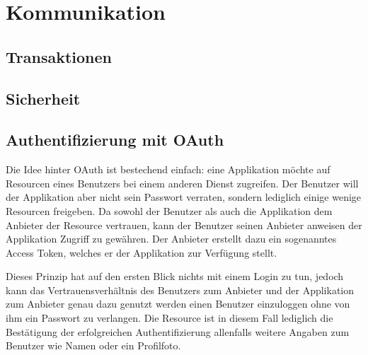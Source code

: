 \section{Kommunikation}

\subsection{Transaktionen}

\subsection{Sicherheit}

\subsection{Authentifizierung mit OAuth}
\label{oauth}

Die Idee hinter OAuth ist bestechend einfach: eine Applikation möchte auf Resourcen eines Benutzers bei einem anderen Dienst zugreifen.
Der Benutzer will der Applikation aber nicht sein Passwort verraten, sondern lediglich einige wenige Resourcen freigeben.
Da sowohl der Benutzer als auch die Applikation dem Anbieter der Resource vertrauen, kann der Benutzer seinen Anbieter anweisen der Applikation Zugriff zu gewähren.
Der Anbieter erstellt dazu ein sogenanntes Access Token, welches er der Applikation zur Verfügung stellt.

Dieses Prinzip hat auf den ersten Blick nichts mit einem Login zu tun, jedoch kann das Vertrauensverhältnis des Benutzers zum Anbieter und der Applikation zum Anbieter genau dazu genutzt werden einen Benutzer einzuloggen ohne von ihm ein Passwort zu verlangen. 
Die Resource ist in diesem Fall lediglich die Bestätigung der erfolgreichen Authentifizierung allenfalls weitere Angaben zum Benutzer wie Namen oder ein Profilfoto.

